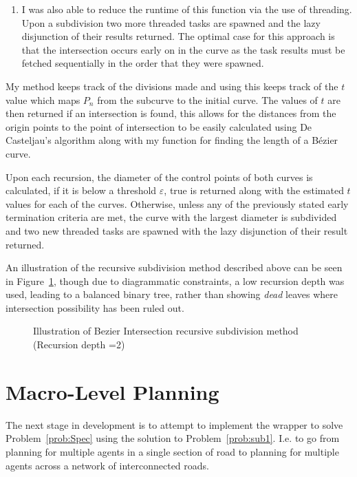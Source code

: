 \begin{enumerate}
  \item I was also able to reduce the runtime of this function via the use of threading. Upon a subdivision two more threaded tasks are spawned and the lazy disjunction of their results returned. The optimal case for this approach is that the intersection occurs early on in the curve as the task results must be fetched sequentially in the order that they were spawned.

\end{enumerate}

My method keeps track of the divisions made and using this keeps track of the $t$ value which maps $P_{n}$ from the subcurve to the initial curve. The values of $t$ are then returned if an intersection is found, this allows for the distances from the origin points to the point of intersection to be easily calculated using De Casteljau's algorithm along with my function for finding the length of a Bézier curve.

Upon each recursion, the diameter of the control points of both curves is calculated, if it is below a threshold $\varepsilon$, true is returned along with the estimated $t$ values for each of the curves. Otherwise, unless any of the previously stated early termination criteria are met, the curve with the largest diameter is subdivided and two new threaded tasks are spawned with the lazy disjunction of their result returned.

An illustration of the recursive subdivision method described above can be seen in Figure~\ref{fig:bezIntIllustration}, though due to diagrammatic constraints, a low recursion depth was used, leading to a balanced binary tree, rather than showing \textit{dead} leaves where intersection possibility has been ruled out.

\begin{figure}
\begin{turn}{90}

\end{turn}
\caption{\label{fig:bezIntIllustration} Illustration of Bezier Intersection recursive subdivision method (Recursion depth =2)}
\end{figure}

\section{Macro-Level Planning}

The next stage in development is to attempt to implement the wrapper to solve Problem~\ref{prob:Spec} using the solution to Problem~\ref{prob:sub1}. I.e. to go from planning for multiple agents in a single section of road to planning for multiple agents across a network of interconnected roads.


